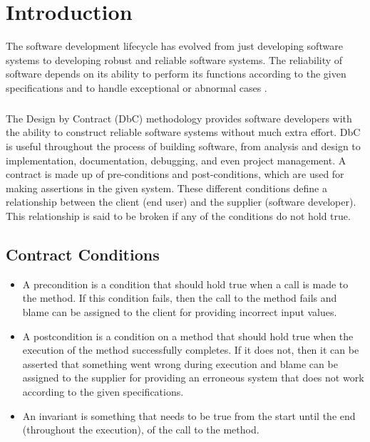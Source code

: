 \chapter{Introduction}

The software development lifecycle has evolved from just developing software systems to developing robust and reliable software systems. The reliability of software depends on its ability to perform its functions according to the given specifications and to handle exceptional or abnormal cases \cite{ApplyingDesignByContract}.
\paragraph{}
The Design by Contract (DbC) methodology provides software developers with the ability to construct reliable software systems without much extra effort. DbC is useful throughout the process of building software, from analysis and design to implementation, documentation, debugging, and even project management\cite{DesignByContractByExample}. A contract is made up of pre-conditions and post-conditions, which are used for making assertions in the given system. These different conditions define a relationship between the client (end user) and the supplier (software developer). This relationship is said to be broken if any of the conditions do not hold true.



\section{Contract Conditions}

\begin{itemize}
\item A precondition is a condition that should hold true when a call is made to the method. If this condition fails, then the call to the method fails and blame can be assigned to the client for providing incorrect input values.
\item A postcondition is a condition on a method that should hold true when the execution of the method successfully completes. If it does not, then it can be asserted that something went wrong during execution and blame can be assigned to the supplier for providing an erroneous system that does not work according to the given specifications.
\item An invariant is something that needs to be true from the start until the end (throughout the execution), of the call to the method.
\end{itemize}

